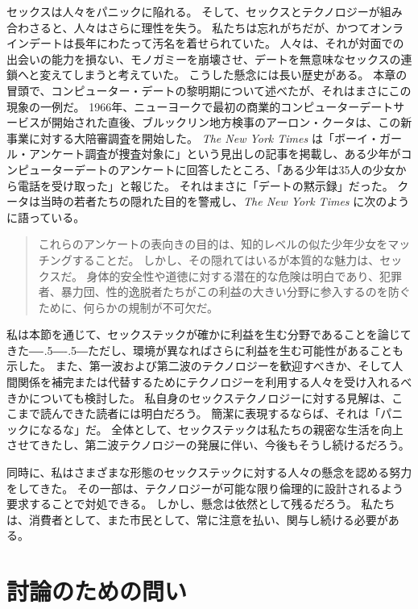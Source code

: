 \documentclass[paper=a4,book,openany]{jlreq}
\newcommand{\ig}[1]{}           %
\def\DDASH{―\kern-.5\zw―\kern-.5\zw―} %
\begin{document}
セックスは人々をパニックに陥れる。
そして、セックスとテクノロジーが組み合わさると、人々はさらに理性を失う。
私たちは忘れがちだが、かつてオンラインデートは長年にわたって汚名を着せられていた。
人々は、それが対面での出会いの能力を損ない、モノガミーを崩壊させ、デートを無意味なセックスの連鎖へと変えてしまうと考えていた。
こうした懸念には長い歴史がある。
本章の冒頭で、コンピューター・デートの黎明期について述べたが、それはまさにこの現象の一例だ。
1966年、ニューヨークで最初の商業的コンピューターデートサービスが開始された直後、ブルックリン地方検事のアーロン・クータ\ig{Aaron E. Koota}は、この新事業に対する大陪審調査を開始した。
\emph{The New York Times} は「ボーイ・ガール・アンケート調査が捜査対象に」という見出しの記事を掲載し、ある少年がコンピューターデートのアンケートに回答したところ、「ある少年は35人の少女から電話を受け取った」と報じた。
それはまさに「デートの黙示録」だった。
クータは当時の若者たちの隠れた目的を警戒し、\emph{The New York Times} に次のように語っている。

\begin{quote}
  これらのアンケートの表向きの目的は、知的レベルの似た少年少女をマッチングすることだ。
しかし、その隠れてはいるが本質的な魅力は、セックスだ。
身体的安全性や道徳に対する潜在的な危険は明白であり、犯罪者、暴力団、性的逸脱者たちがこの利益の大きい分野に参入するのを防ぐために、何らかの規制が不可欠だ。
\citep{anderson66:_boy_girl_quest_inves}\ig{David Anderson}
\end{quote}

私は本節を通じて、セックステックが確かに利益を生む分野であることを論じてきた{\DDASH}ただし、環境が異なればさらに利益を生む可能性があることも示した。
また、第一波および第二波のテクノロジーを歓迎すべきか、そして人間関係を補完または代替するためにテクノロジーを利用する人々を受け入れるべきかについても検討した。
私自身のセックステクノロジーに対する見解は、ここまで読んできた読者には明白だろう。
簡潔に表現するならば、それは「パニックになるな」だ。
全体として、セックステックは私たちの親密な生活を向上させてきたし、第二波テクノロジーの発展に伴い、今後もそうし続けるだろう。

同時に、私はさまざまな形態のセックステックに対する人々の懸念を認める努力をしてきた。
その一部は、テクノロジーが可能な限り倫理的に設計されるよう要求することで対処できる。
しかし、懸念は依然として残るだろう。
私たちは、消費者として、また市民として、常に注意を払い、関与し続ける必要がある。

\section{討論のための問い}
\end{document}
